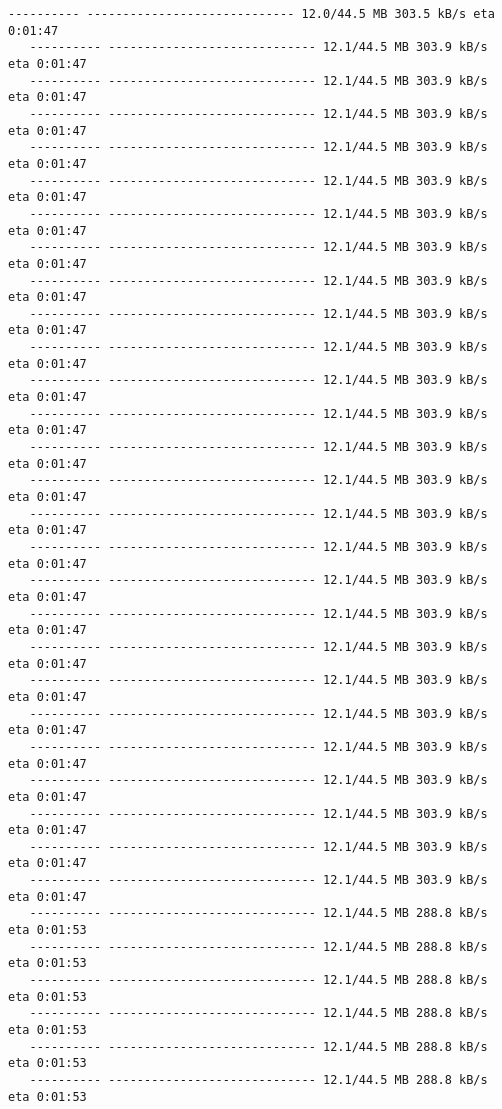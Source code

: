 \documentclass[11pt]{article}
\begin{document}
\begin{Verbatim}[commandchars=\\\{\}]
   ---------- ----------------------------- 12.0/44.5 MB 303.5 kB/s eta 0:01:47
   ---------- ----------------------------- 12.1/44.5 MB 303.9 kB/s eta 0:01:47
   ---------- ----------------------------- 12.1/44.5 MB 303.9 kB/s eta 0:01:47
   ---------- ----------------------------- 12.1/44.5 MB 303.9 kB/s eta 0:01:47
   ---------- ----------------------------- 12.1/44.5 MB 303.9 kB/s eta 0:01:47
   ---------- ----------------------------- 12.1/44.5 MB 303.9 kB/s eta 0:01:47
   ---------- ----------------------------- 12.1/44.5 MB 303.9 kB/s eta 0:01:47
   ---------- ----------------------------- 12.1/44.5 MB 303.9 kB/s eta 0:01:47
   ---------- ----------------------------- 12.1/44.5 MB 303.9 kB/s eta 0:01:47
   ---------- ----------------------------- 12.1/44.5 MB 303.9 kB/s eta 0:01:47
   ---------- ----------------------------- 12.1/44.5 MB 303.9 kB/s eta 0:01:47
   ---------- ----------------------------- 12.1/44.5 MB 303.9 kB/s eta 0:01:47
   ---------- ----------------------------- 12.1/44.5 MB 303.9 kB/s eta 0:01:47
   ---------- ----------------------------- 12.1/44.5 MB 303.9 kB/s eta 0:01:47
   ---------- ----------------------------- 12.1/44.5 MB 303.9 kB/s eta 0:01:47
   ---------- ----------------------------- 12.1/44.5 MB 303.9 kB/s eta 0:01:47
   ---------- ----------------------------- 12.1/44.5 MB 303.9 kB/s eta 0:01:47
   ---------- ----------------------------- 12.1/44.5 MB 303.9 kB/s eta 0:01:47
   ---------- ----------------------------- 12.1/44.5 MB 303.9 kB/s eta 0:01:47
   ---------- ----------------------------- 12.1/44.5 MB 303.9 kB/s eta 0:01:47
   ---------- ----------------------------- 12.1/44.5 MB 303.9 kB/s eta 0:01:47
   ---------- ----------------------------- 12.1/44.5 MB 303.9 kB/s eta 0:01:47
   ---------- ----------------------------- 12.1/44.5 MB 303.9 kB/s eta 0:01:47
   ---------- ----------------------------- 12.1/44.5 MB 303.9 kB/s eta 0:01:47
   ---------- ----------------------------- 12.1/44.5 MB 303.9 kB/s eta 0:01:47
   ---------- ----------------------------- 12.1/44.5 MB 303.9 kB/s eta 0:01:47
   ---------- ----------------------------- 12.1/44.5 MB 303.9 kB/s eta 0:01:47
   ---------- ----------------------------- 12.1/44.5 MB 288.8 kB/s eta 0:01:53
   ---------- ----------------------------- 12.1/44.5 MB 288.8 kB/s eta 0:01:53
   ---------- ----------------------------- 12.1/44.5 MB 288.8 kB/s eta 0:01:53
   ---------- ----------------------------- 12.1/44.5 MB 288.8 kB/s eta 0:01:53
   ---------- ----------------------------- 12.1/44.5 MB 288.8 kB/s eta 0:01:53
   ---------- ----------------------------- 12.1/44.5 MB 288.8 kB/s eta 0:01:53

\end{Verbatim}
\end{document}
